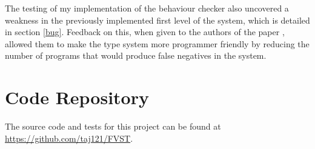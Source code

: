 The testing of my implementation of the behaviour checker also uncovered a weakness in the previously implemented first level of the system, which is detailed in section \ref{bug}. Feedback on this, when given to the authors of the paper \cite{paper1}, allowed them to make the type system more programmer friendly by reducing the number of programs that would produce false negatives in the system.


\chapter*{Code Repository}

The source code and tests for this project can be found at \url{https://github.com/taj121/FVST}.

